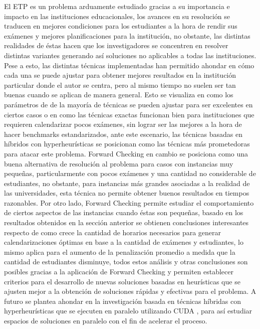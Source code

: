 \documentclass[letter, 10pt]{article}
\begin{document}
El ETP es un problema arduamente estudiado gracias a su importancia e impacto en las instituciones educacionales, los avances en su resolución se traducen en mejores condiciones para los estudiantes a la hora de rendir sus exámenes y mejores planificaciones para la institución, no obstante, las distintas realidades de éstas hacen que los investigadores se concentren en resolver distintas variantes generando así soluciones no aplicables a todas las instituciones. Pese a esto, las distintas técnicas implementadas han permitido ahondar en cómo cada una se puede ajustar para obtener mejores resultados en la institución particular donde el autor se centra, pero al mismo tiempo no suelen ser tan buenas cuando se aplican de manera general. Esto se visualiza en como los parámetros de de la mayoría de técnicas se pueden ajustar para ser excelentes en ciertos casos o en como las técnicas exactas funcionan bien para instituciones que requieren calendarizar pocos exámenes, sin lograr ser las mejores a la hora de hacer benchmarks estandarizados, ante este escenario, las técnicas basadas en híbridos con hyperheurísticas se posicionan como las técnicas más prometedoras para atacar este problema. Forward Checking en cambio se posiciona como una buena alternativa de resolución al problema para casos con instancias muy pequeñas, particularmente con pocos exámenes y una cantidad no considerable de estudiantes, no obstante, para instancias más grandes asociadas a la realidad de las universidades, esta técnica no permite obtener buenos resultados en tiempos razonables. Por otro lado, Forward Checking permite estudiar el comportamiento de ciertos aspectos de las instancias cuando éstas son pequeñas, basado en los resultados obtenidos en la sección anterior se obtienen conclusiones interesantes respecto de como crece la cantidad de horarios necesarios para generar calendarizaciones óptimas en base a la cantidad de exámenes y estudiantes, lo mismo aplica para el aumento de la penalización promedio a medida que la cantidad de estudiantes disminuye, todos estos análisis y otras conclusiones son posibles gracias a la aplicación de Forward Checking y permiten establecer criterios para el desarrollo de nuevas soluciones basadas en heurísticas que se ajusten mejor a la obtención de soluciones rápidas y efectivas para el problema. A futuro se plantea ahondar en la investigación basada en técnicas híbridas con hyperheurísticas que se ejecuten en paralelo utilizando CUDA \cite{cuda}, para así estudiar espacios de soluciones en paralelo con el fin de acelerar el proceso.
\end{document}
